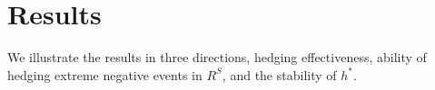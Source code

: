 \section{Results}
We illustrate the results in three directions, hedging effectiveness,
ability of hedging extreme negative events in $R^S$, and the stability of $h^*$.



